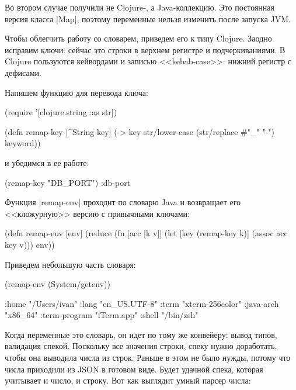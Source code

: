 Во втором случае получили не Clojure-, а Java-коллекцию. Это постоянная версия
класса \spverb|Map|, поэтому переменные нельзя изменить после запуска JVM.

Чтобы облегчить работу со словарем, приведем его к типу Clojure. Заодно исправим
ключи: сейчас это строки в верхнем регистре и подчеркиваниями. В Clojure
пользуются кейвордами и записью <<kebab-case>>: нижний регистр с дефисами.

Напишем функцию для перевода ключа:

\begin{english}
  \begin{clojure}
(require '[clojure.string :as str])

(defn remap-key [^String key]
  (-> key
      str/lower-case
      (str/replace #"_" "-")
      keyword))
  \end{clojure}
\end{english}

\noindent
и убедимся в ее работе:

\begin{english}
  \begin{clojure}
(remap-key "DB_PORT")
:db-port
  \end{clojure}
\end{english}

Функция \spverb|remap-env| проходит по словарю Java и возвращает его
<<кложурную>> версию с привычными ключами:

\begin{english}
  \begin{clojure}
(defn remap-env [env]
  (reduce
   (fn [acc [k v]]
     (let [key (remap-key k)]
       (assoc acc key v)))
   {}
   env))
  \end{clojure}
\end{english}

\noindent
Приведем небольшую часть словаря:

\begin{english}
  \begin{clojure}
(remap-env (System/getenv))

{:home "/Users/ivan"
 :lang "en_US.UTF-8"
 :term "xterm-256color"
 :java-arch "x86_64"
 :term-program "iTerm.app"
 :shell "/bin/zsh"}
  \end{clojure}
\end{english}

Когда переменные это словарь, он идет по тому же конвейеру: вывод типов,
валидация спекой. Поскольку все значения строки, спеку нужно доработать, чтобы
она выводила числа из строк. Раньше в этом не было нужды, потому что числа
приходили из JSON в готовом виде. Будет удачной спека, которая учитывает и
число, и строку. Вот как выглядит умный парсер числа:


